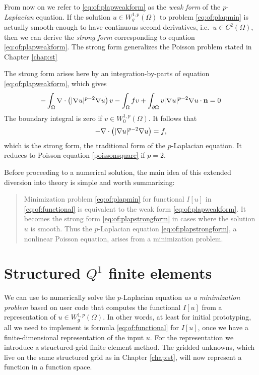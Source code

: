 From now on we refer to \eqref{eq:of:plapweakform} as the \emph{weak form} of the $p$-\emph{Laplacian} equation.  If the solution $u \in W_g^{1,p}(\Omega)$ to problem \eqref{eq:of:plapmin} is actually smooth-enough to have continuous second derivatives, i.e.~$u \in C^2(\Omega)$, then we can derive the \emph{strong form} corresponding to equation \eqref{eq:of:plapweakform}.  The strong form generalizes the Poisson problem stated in Chapter \ref{chap:st}

The strong form arises here by an integration-by-parts \citep{Evans2010} of equation \eqref{eq:of:plapweakform}, which gives
    $$-\int_\Omega \nabla\cdot\left(|\nabla u|^{p-2} \nabla u\right) v - \int_\Omega f v + \int_{\partial \Omega} v |\nabla u|^{p-2} \nabla u \cdot \mathbf{n} = 0$$
The boundary integral is zero if $v\in W_0^{1,p}(\Omega)$.  It follows that
\begin{equation}
- \nabla\cdot\left(|\nabla u|^{p-2} \nabla u\right) = f,
\label{eq:of:plapstrongform}
\end{equation}
which is the strong form, the traditional form of the $p$-Laplacian equation.  It reduces to Poisson equation \eqref{poissonsquare} if $p=2$.

Before proceeding to a numerical solution, the main idea of this extended diversion into theory is simple and worth summarizing:
\begin{quote}
Minimization problem \eqref{eq:of:plapmin} for functional $I[u]$ in \eqref{eq:of:functional} is equivalent to the weak form \eqref{eq:of:plapweakform}.  It becomes the strong form \eqref{eq:of:plapstrongform} in cases where the solution $u$ is smooth.  Thus the $p$-Laplacian equation \eqref{eq:of:plapstrongform}, a nonlinear Poisson equation, arises from a minimization problem.
\end{quote}


\section{Structured $Q^1$ finite elements}

We can use \PETSc to numerically solve the $p$-Laplacian equation \emph{as a minimization problem} based on user code that computes the functional $I[u]$ from a representation of $u \in W_g^{1,p}(\Omega)$.  In other words, at least for initial prototyping, all we need to implement is formula \eqref{eq:of:functional} for $I[u]$, once we have a finite-dimensional representation of the input $u$.  For the representation we introduce a structured-grid finite element method.  The gridded unknowns, which live on the same structured grid as in Chapter \ref{chap:st}, will now represent a function in a function space.

